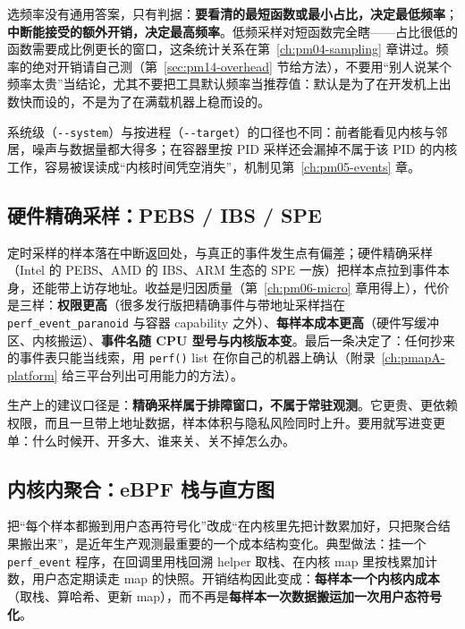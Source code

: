 \documentclass[12pt,a4paper,fontset=fandol]{ctexbook}
\newcommand{\Fn}[1]{\texttt{#1()}}
\newcommand{\Tp}[1]{\texttt{#1}}
\newcommand{\Opt}[1]{\texttt{-\/-#1}}
\newcommand{\Bk}{\discretionary{}{}{}}
\begin{document}
选频率没有通用答案，只有判据：\textbf{要看清的最短函数或最小占比，决定最低频率}；\textbf{中断能接受的额外开销，决定最高频率}。低频采样对短函数完全瞎——占比很低的函数需要成比例更长的窗口，这条统计关系在第~\ref{ch:pm04-sampling} 章讲过。频率的绝对开销请自己测（第~\ref{sec:pm14-overhead} 节给方法），不要用``别人说某个频率太贵''当结论，尤其不要把工具默认频率当推荐值：默认是为了在开发机上出数快而设的，不是为了在满载机器上稳而设的。

系统级（\Opt{system}）与按进程（\Opt{target}）的口径也不同：前者能看见内核与邻居，噪声与数据量都大得多；在容器里按 PID 采样还会漏掉不属于该 PID 的内核工作，容易被误读成``内核时间凭空消失''，机制见第~\ref{ch:pm05-events} 章。

\subsection{硬件精确采样：PEBS / IBS / SPE}
\label{sub:pm14-precise}

定时采样的样本落在中断返回处，与真正的事件发生点有偏差；硬件精确采样（Intel 的 PEBS、AMD 的 IBS、ARM 生态的 SPE 一族）把样本点拉到事件本身，还能带上访存地址。收益是归因质量（第~\ref{ch:pm06-micro} 章用得上），代价是三样：\textbf{权限更高}（很多发行版把精确事件与带地址采样挡在 \Tp{perf{\Bk}\_event{\Bk}\_paranoid} 与容器 capability 之外）、\textbf{每样本成本更高}（硬件写缓冲区、内核搬运）、\textbf{事件名随 CPU 型号与内核版本变}。最后一条决定了：任何抄来的事件表只能当线索，用 \Fn{perf} list 在你自己的机器上确认（附录~\ref{ch:pmapA-platform} 给三平台列出可用能力的方法）。

生产上的建议口径是：\textbf{精确采样属于排障窗口，不属于常驻观测}。它更贵、更依赖权限，而且一旦带上地址数据，样本体积与隐私风险同时上升。要用就写进变更单：什么时候开、开多大、谁来关、关不掉怎么办。

\subsection{内核内聚合：eBPF 栈与直方图}
\label{sub:pm14-ebpf}

把``每个样本都搬到用户态再符号化''改成``在内核里先把计数累加好，只把聚合结果搬出来''，是近年生产观测最重要的一个成本结构变化。典型做法：挂一个 \Tp{perf{\Bk}\_event} 程序，在回调里用栈回溯 helper 取栈、在内核 map 里按栈累加计数，用户态定期读走 map 的快照。开销结构因此变成：\textbf{每样本一个内核内成本}（取栈、算哈希、更新 map），而不再是\textbf{每样本一次数据搬运加一次用户态符号化}。
\end{document}
